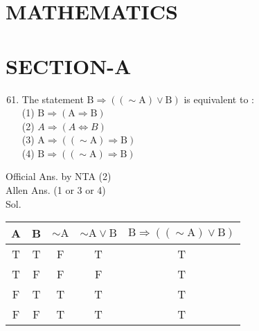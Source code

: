 \documentclass[10pt]{article}
\begin{document}
\section*{MATHEMATICS}
\section*{SECTION-A}
\begin{enumerate}
  \setcounter{enumi}{60}
  \item The statement \(\mathrm{B} \Rightarrow((\sim \mathrm{A}) \vee \mathrm{B})\) is equivalent to :\\
(1) \(\mathrm{B} \Rightarrow(\mathrm{A} \Rightarrow \mathrm{B})\)\\
(2) \(A \Rightarrow(A \Leftrightarrow B)\)\\
(3) \(\mathrm{A} \Rightarrow((\sim \mathrm{A}) \Rightarrow \mathrm{B})\)\\
(4) \(\mathrm{B} \Rightarrow((\sim \mathrm{A}) \Rightarrow \mathrm{B})\)
\end{enumerate}

Official Ans. by NTA (2)\\
Allen Ans. (1 or 3 or 4)\\
Sol.

\begin{center}
\begin{tabular}{|c|c|c|c|c|}
\hline
A & B & \(\sim \mathrm{A}\) & \(\sim \mathrm{A} \vee \mathrm{B}\) & \(\mathrm{B} \Rightarrow((\sim \mathrm{A}) \vee \mathrm{B})\) \\
\hline
T & T & F & T & T \\
\hline
T & F & F & F & T \\
\hline
F & T & T & T & T \\
\hline
F & F & T & T & T \\
\hline
\end{tabular}
\end{center}
\end{document}
